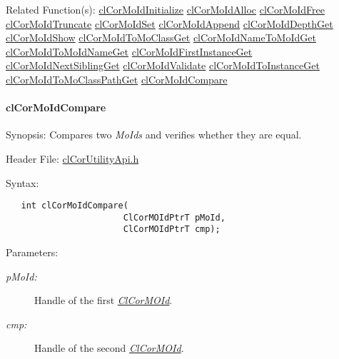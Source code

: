 \begin{Desc}
\item[Related Function(s):]\hyperlink{group__group13}{cl\-Cor\-Mo\-Id\-Initialize} \hyperlink{group__group13}{cl\-Cor\-Mo\-Id\-Alloc} \hyperlink{group__group13}{cl\-Cor\-Mo\-Id\-Free} \hyperlink{group__group13}{cl\-Cor\-Mo\-Id\-Truncate} \hyperlink{group__group13}{cl\-Cor\-Mo\-Id\-Set} \hyperlink{group__group13}{cl\-Cor\-Mo\-Id\-Append} \hyperlink{group__group13}{cl\-Cor\-Mo\-Id\-Depth\-Get} \hyperlink{group__group13}{cl\-Cor\-Mo\-Id\-Show} \hyperlink{group__group13}{cl\-Cor\-Mo\-Id\-To\-Mo\-Class\-Get} \hyperlink{group__group13}{cl\-Cor\-Mo\-Id\-Name\-To\-Mo\-Id\-Get} \hyperlink{group__group13}{cl\-Cor\-Mo\-Id\-To\-Mo\-Id\-Name\-Get} \hyperlink{group__group13}{cl\-Cor\-Mo\-Id\-First\-Instance\-Get} \hyperlink{group__group13}{cl\-Cor\-Mo\-Id\-Next\-Sibling\-Get} \hyperlink{group__group13}{cl\-Cor\-Mo\-Id\-Validate} \hyperlink{group__group13}{cl\-Cor\-Mo\-Id\-To\-Instance\-Get} \hyperlink{group__group13}{cl\-Cor\-Mo\-Id\-To\-Mo\-Class\-Path\-Get} \hyperlink{group__group13}{cl\-Cor\-Mo\-Id\-Compare} \end{Desc}
\hypertarget{pagecor245}{}\paragraph{cl\-Cor\-Mo\-Id\-Compare}\label{pagecor245}
\begin{Desc}
\item[Synopsis:]Compares two {\em Mo\-Ids\/} and verifies whether they are equal.\end{Desc}
\begin{Desc}
\item[Header File:]\hyperlink{cl_cor_utility_api_8h}{cl\-Cor\-Utility\-Api.h}\end{Desc}
\begin{Desc}
\item[Syntax:]

\footnotesize\begin{verbatim}   int clCorMoIdCompare(
                       ClCorMOIdPtrT pMoId,
                       ClCorMOIdPtrT cmp);
\end{verbatim}
\normalsize
\end{Desc}
\begin{Desc}
\item[Parameters:]
\begin{description}
\item[{\em p\-Mo\-Id:}]Handle of the first {\em \hyperlink{struct_cl_cor_m_o_id}{Cl\-Cor\-MOId}\/}. \item[{\em cmp:}]Handle of the second {\em \hyperlink{struct_cl_cor_m_o_id}{Cl\-Cor\-MOId}\/}.\end{description}
\end{Desc}
